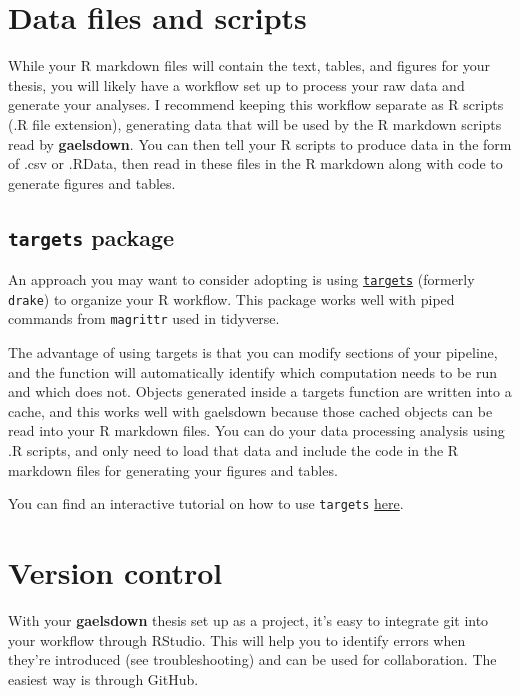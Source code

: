 \documentclass[12pt, oneside]{queensuthesis}
\numberwithin{equation}{chapter}       %
\begin{document}
\hypertarget{data-files-and-scripts}{%
\section{Data files and scripts}\label{data-files-and-scripts}}

While your R markdown files will contain the text, tables, and figures for your thesis, you will likely have a workflow set up to process your raw data and generate your analyses. I recommend keeping this workflow separate as R scripts (.R file extension), generating data that will be used by the R markdown scripts read by \textbf{gaelsdown}. You can then tell your R scripts to produce data in the form of .csv or .RData, then read in these files in the R markdown along with code to generate figures and tables.

\hypertarget{targets-package}{%
\subsection{\texorpdfstring{\texttt{targets} package}{targets package}}\label{targets-package}}

An approach you may want to consider adopting is using \href{https://books.ropensci.org/targets/}{\texttt{targets}} (formerly \texttt{drake}) to organize your R workflow. This package works well with piped commands from \texttt{magrittr} used in tidyverse.

The advantage of using targets is that you can modify sections of your pipeline, and the function will automatically identify which computation needs to be run and which does not. Objects generated inside a targets function are written into a cache, and this works well with gaelsdown because those cached objects can be read into your R markdown files. You can do your data processing analysis using .R scripts, and only need to load that data and include the code in the R markdown files for generating your figures and tables.

You can find an interactive tutorial on how to use \texttt{targets} \href{https://github.com/wlandau/targets-tutorial}{here}.

\hypertarget{version-control}{%
\section{Version control}\label{version-control}}

With your \textbf{gaelsdown} thesis set up as a project, it's easy to integrate git into your workflow through RStudio. This will help you to identify errors when they're introduced (see troubleshooting) and can be used for collaboration. The easiest way is through GitHub.
\end{document}
